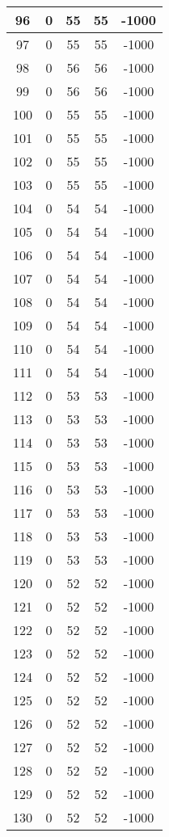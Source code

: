 \documentclass[letterpaper, 12pt]{article}
\begin{document}
\begin{longtable}{|c|c|c|c|c|}
\hline
96 & 0 & 55 & 55 & -1000 \\
\hline
97 & 0 & 55 & 55 & -1000 \\
\hline
98 & 0 & 56 & 56 & -1000 \\
\hline
99 & 0 & 56 & 56 & -1000 \\
\hline
100 & 0 & 55 & 55 & -1000 \\
\hline
101 & 0 & 55 & 55 & -1000 \\
\hline
102 & 0 & 55 & 55 & -1000 \\
\hline
103 & 0 & 55 & 55 & -1000 \\
\hline
104 & 0 & 54 & 54 & -1000 \\
\hline
105 & 0 & 54 & 54 & -1000 \\
\hline
106 & 0 & 54 & 54 & -1000 \\
\hline
107 & 0 & 54 & 54 & -1000 \\
\hline
108 & 0 & 54 & 54 & -1000 \\
\hline
109 & 0 & 54 & 54 & -1000 \\
\hline
110 & 0 & 54 & 54 & -1000 \\
\hline
111 & 0 & 54 & 54 & -1000 \\
\hline
112 & 0 & 53 & 53 & -1000 \\
\hline
113 & 0 & 53 & 53 & -1000 \\
\hline
114 & 0 & 53 & 53 & -1000 \\
\hline
115 & 0 & 53 & 53 & -1000 \\
\hline
116 & 0 & 53 & 53 & -1000 \\
\hline
117 & 0 & 53 & 53 & -1000 \\
\hline
118 & 0 & 53 & 53 & -1000 \\
\hline
119 & 0 & 53 & 53 & -1000 \\
\hline
120 & 0 & 52 & 52 & -1000 \\
\hline
121 & 0 & 52 & 52 & -1000 \\
\hline
122 & 0 & 52 & 52 & -1000 \\
\hline
123 & 0 & 52 & 52 & -1000 \\
\hline
124 & 0 & 52 & 52 & -1000 \\
\hline
125 & 0 & 52 & 52 & -1000 \\
\hline
126 & 0 & 52 & 52 & -1000 \\
\hline
127 & 0 & 52 & 52 & -1000 \\
\hline
128 & 0 & 52 & 52 & -1000 \\
\hline
129 & 0 & 52 & 52 & -1000 \\
\hline
130 & 0 & 52 & 52 & -1000 \\

\end{longtable}
\end{document}
